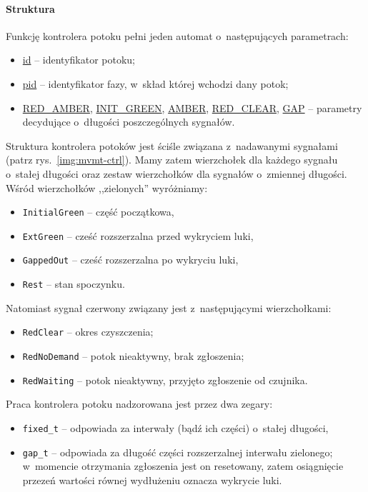 \documentclass{pracamgr}
\newcommand{\imgr}[1]{rys.~\ref{#1}}
\theoremstyle{plain}
\begin{document}
\paragraph{Struktura} Funkcję kontrolera potoku pełni jeden automat
o~następujących parametrach:
\begin{itemize}
  \item \url{id} -- identyfikator potoku;
  \item \url{pid} -- identyfikator fazy, w~skład której wchodzi dany potok;
  \item \url{RED_AMBER}, \url{INIT_GREEN}, \url{AMBER},
  \url{RED_CLEAR}, \url{GAP} -- parametry decydujące o~długości
  poszczególnych sygnałów.
\end{itemize}
Struktura kontrolera potoków jest ściśle związana z~nadawanymi
sygnałami (patrz \imgr{img:mvmt-ctrl}). Mamy zatem wierzchołek dla
każdego sygnału o~stałej długości oraz zestaw wierzchołków dla
sygnałów o~zmiennej długości. Wśród wierzchołków ,,zielonych''
wyróżniamy:
\begin{itemize}
  \item \texttt{InitialGreen} -- część początkowa,
  \item \texttt{ExtGreen} -- cześć rozszerzalna przed wykryciem luki,
  \item \texttt{GappedOut} -- cześć rozszerzalna po wykryciu luki,
  \item \texttt{Rest} -- stan spoczynku.
\end{itemize}
Natomiast sygnał czerwony związany jest z~następującymi wierzchołkami:
\begin{itemize}
  \item \texttt{RedClear} -- okres czyszczenia;
  \item \texttt{RedNoDemand} -- potok nieaktywny, brak zgłoszenia;
  \item \texttt{RedWaiting} -- potok nieaktywny, przyjęto zgłoszenie
  od czujnika.
\end{itemize}
Praca kontrolera potoku nadzorowana jest przez dwa zegary:
\begin{itemize}
  \item \texttt{fixed\_t} -- odpowiada za interwały (bądź ich części)
  o~stałej długości,
  \item \texttt{gap\_t} -- odpowiada za długość części rozszerzalnej
  interwału zielonego; w~momencie otrzymania zgłoszenia jest on
  resetowany, zatem osiągnięcie przezeń wartości równej wydłużeniu
  oznacza wykrycie luki.
\end{itemize}
\end{document}
